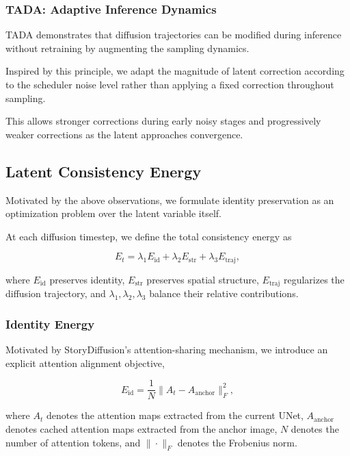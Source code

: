\documentclass[12pt]{article}
\begin{document}
\subsubsection{TADA: Adaptive Inference Dynamics}

TADA demonstrates that diffusion trajectories can be modified during inference without retraining by augmenting the sampling dynamics.

Inspired by this principle, we adapt the magnitude of latent correction according to the scheduler noise level rather than applying a fixed correction throughout sampling.

This allows stronger corrections during early noisy stages and progressively weaker corrections as the latent approaches convergence.

\subsection{Latent Consistency Energy}

Motivated by the above observations, we formulate identity preservation as an optimization problem over the latent variable itself.

At each diffusion timestep, we define the total consistency energy as

\begin{equation}
E_t = \lambda_1 E_{\mathrm{id}} + \lambda_2 E_{\mathrm{str}} + \lambda_3 E_{\mathrm{traj}},
\tag{6}
\end{equation}

where $E_{\mathrm{id}}$ preserves identity, $E_{\mathrm{str}}$ preserves spatial structure, $E_{\mathrm{traj}}$ regularizes the diffusion trajectory, and $\lambda_1, \lambda_2, \lambda_3$ balance their relative contributions.

\subsubsection{Identity Energy}

Motivated by StoryDiffusion's attention-sharing mechanism, we introduce an explicit attention alignment objective,

\begin{equation}
E_{\mathrm{id}} = \frac{1}{N} \|A_t - A_{\mathrm{anchor}}\|_F^2,
\tag{7}
\end{equation}

where $A_t$ denotes the attention maps extracted from the current UNet, $A_{\mathrm{anchor}}$ denotes cached attention maps extracted from the anchor image, $N$ denotes the number of attention tokens, and $\|\cdot\|_F$ denotes the Frobenius norm.
\end{document}
